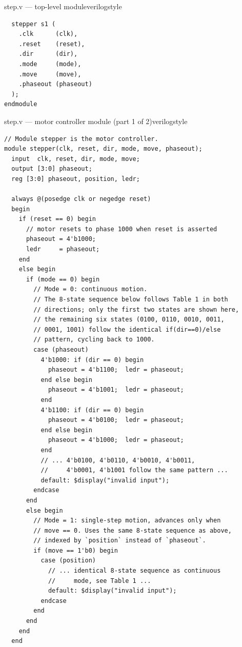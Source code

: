 \begin{procedure}
\begin{codepanel}{step.v --- top-level module}{verilogstyle}
\begin{lstlisting}
  stepper s1 (
    .clk      (clk),
    .reset    (reset),
    .dir      (dir),
    .mode     (mode),
    .move     (move),
    .phaseout (phaseout)
  );
endmodule
\end{lstlisting}
  \end{codepanel}
  \newpage

  \begin{codepanel}{step.v --- motor controller module (part 1 of 2)}{verilogstyle}
    \begin{lstlisting}
// Module stepper is the motor controller.
module stepper(clk, reset, dir, mode, move, phaseout);
  input  clk, reset, dir, mode, move;
  output [3:0] phaseout;
  reg [3:0] phaseout, position, ledr;

  always @(posedge clk or negedge reset)
  begin
    if (reset == 0) begin
      // motor resets to phase 1000 when reset is asserted
      phaseout = 4'b1000;
      ledr     = phaseout;
    end
    else begin
      if (mode == 0) begin
        // Mode = 0: continuous motion.
        // The 8-state sequence below follows Table 1 in both
        // directions; only the first two states are shown here,
        // the remaining six states (0100, 0110, 0010, 0011,
        // 0001, 1001) follow the identical if(dir==0)/else
        // pattern, cycling back to 1000.
        case (phaseout)
          4'b1000: if (dir == 0) begin
            phaseout = 4'b1100;  ledr = phaseout;
          end else begin
            phaseout = 4'b1001;  ledr = phaseout;
          end
          4'b1100: if (dir == 0) begin
            phaseout = 4'b0100;  ledr = phaseout;
          end else begin
            phaseout = 4'b1000;  ledr = phaseout;
          end
          // ... 4'b0100, 4'b0110, 4'b0010, 4'b0011,
          //     4'b0001, 4'b1001 follow the same pattern ...
          default: $display("invalid input");
        endcase
      end
      else begin
        // Mode = 1: single-step motion, advances only when
        // move == 0. Uses the same 8-state sequence as above,
        // indexed by `position` instead of `phaseout`.
        if (move == 1'b0) begin
          case (position)
            // ... identical 8-state sequence as continuous
            //     mode, see Table 1 ...
            default: $display("invalid input");
          endcase
        end
      end
    end
  end
\end{lstlisting}
  \end{codepanel}
  \vspace{-4pt}


\end{procedure}
